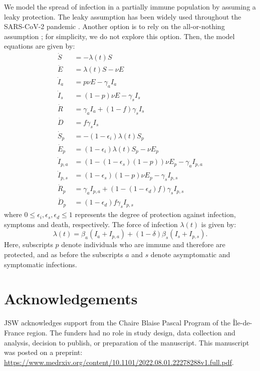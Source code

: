 \documentclass[12pt]{article}
\begin{document}
We model the spread of infection in a partially immune population by assuming a leaky protection.
The leaky assumption has been widely used throughout the SARS-CoV-2 pandemic \citep{saad2020immune}.
Another option is to rely on the all-or-nothing assumption \citep{smith1984assessment,buckner2021dynamic,bubar2021model};
for simplicity, we do not explore this option.
Then, the model equations are given by:
\begin{align}
\dot{S} &= -\lambda (t) S \\
\dot{E} &= \lambda (t) S - \nu E\\
\dot{I}_a &= p \nu E - \gamma_a I_a\\
\dot{I}_s &= (1-p) \nu E -\gamma_s I_s\\
\dot{R} &= \gamma_a I_a + (1-f) \gamma_s I_s \\
\dot{D} &= f \gamma_s I_s\\
\dot{S}_p &= - (1-\epsilon_i) \lambda (t) S_p \\
\dot{E}_p &= (1-\epsilon_i) \lambda (t) S_p - \nu E_p\\
\dot{I}_{p, a} &= (1 - (1-\epsilon_s) (1-p)) \nu E_p - \gamma_a I_{p,a}\\
\dot{I}_{p, s} &= (1-\epsilon_s) (1-p) \nu E_p -\gamma_s I_{p,s}\\
\dot{R}_p &= \gamma_a I_{p,a} + (1-(1-\epsilon_d) f) \gamma_s I_{p,s} \\
\dot{D}_p &= (1-\epsilon_d) f \gamma_s I_{p,s}
\end{align}
where $0\leq \epsilon_i, \epsilon_s, \epsilon_d \leq 1$ represents the degree of protection against infection, symptoms and death, respectively. 
The force of infection $\lambda(t)$ is given by:
\begin{equation}
\lambda(t) = \beta_a (I_a + I_{p,a}) + (1-\delta) \beta_s (I_s + I_{p,s}).
\end{equation}
Here, subscripts $p$ denote individuals who are immune and therefore are protected, and as before the subscripts $a$ and $s$ denote asymptomatic and symptomatic infections.

\section*{Acknowledgements}

JSW acknowledges support from the Chaire Blaise Pascal Program of the Île-de-France region.
The funders had no role in study design, data collection and analysis, decision to publish, or preparation of the manuscript. 
This manuscript was posted on a preprint: \url{https://www.medrxiv.org/content/10.1101/2022.08.01.22278288v1.full.pdf}.
\end{document}
